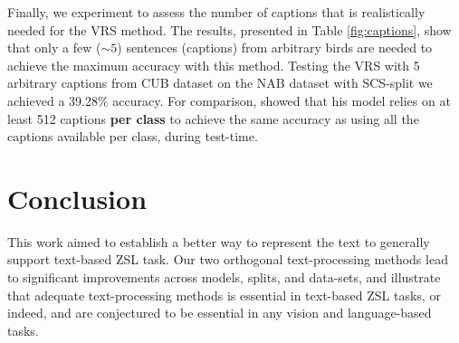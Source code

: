 \documentclass[11pt,a4paper]{article}
\newcommand\reut[1]{\textcolor{green}{\textbf{REUT:} #1 }}
\begin{document}
Finally, we experiment to assess the  number of captions that is realistically needed for the VRS method. The results, presented in Table \ref{fig:captions}, show that only a few ($\sim5$) 
 sentences (captions) from arbitrary birds are needed to achieve the maximum accuracy with this method.
Testing the VRS with 5 arbitrary captions from CUB dataset on the NAB dataset with SCS-split we achieved a 39.28\% accuracy. %
For comparison, \citet{reed2016learning} showed that his model relies on at least 512 captions \textbf{per class} to achieve the same accuracy as using all the captions available per class, during test-time.




\par



\section{Conclusion}
\label{conclusion}

This work aimed to establish a better way to represent the text to generally support text-based ZSL task. Our two orthogonal text-processing methods lead to significant improvements across models, splits, and data-sets, and illustrate that adequate text-processing methods is essential  in text-based ZSL tasks, or indeed, and are conjectured to be essential in any vision and language-based tasks. 




\end{document}
